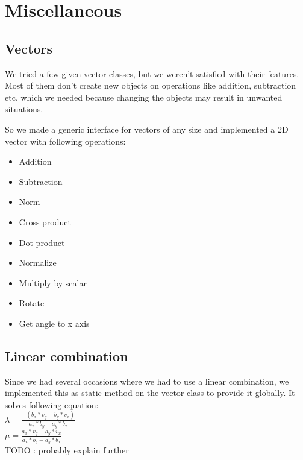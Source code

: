 
\section{Miscellaneous}

\subsection{Vectors}
\label{sec:vectors}

We tried a few given vector classes, but we weren't satisfied
with their features. Most of them don't create new objects
on operations like addition, subtraction etc. which we needed because 
changing the objects may result in unwanted situations. %

\noindent So we made a generic interface for vectors of any size and
implemented a 2D vector with following operations:

\begin{itemize}
\item Addition
\item Subtraction
\item Norm
\item Cross product
\item Dot product
\item Normalize
\item Multiply by scalar
\item Rotate 
\item Get angle to x axis
\end{itemize}

\subsection{Linear combination}
\label{sec:linearCombination}

Since we had several occasions where we had to use a
linear combination, we implemented this as static method
on the vector class to provide it globally. It solves following
equation: \\

$ \lambda = \frac{-(b_x*v_y - b_y * v_x)}{a_x * b_y - a_y * b_x}$\\

$\mu = \frac{a_x * v_y - a_y * v_x}{a_x * b_y - a_y * b_x} $ \\

TODO : probably explain further
